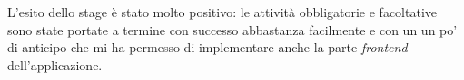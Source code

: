 L'esito dello stage è stato molto positivo: le attività obbligatorie e facoltative sono state portate a termine con successo abbastanza facilmente 
e con un un po' di anticipo che mi ha permesso di implementare anche la parte \textit{frontend} dell'applicazione.

%
%

\endgroup			

\vfill

